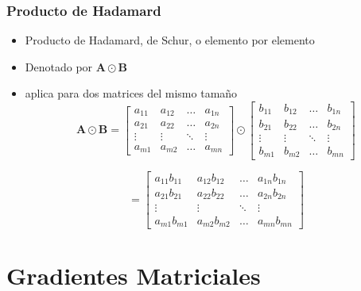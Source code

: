 \documentclass{beamer}
\begin{document}
\begin{frame}
\frametitle{Producto de Hadamard}
\begin{itemize}
\item Producto de Hadamard, de Schur, o elemento por elemento
\item Denotado por $\boldsymbol{A} \odot \boldsymbol{B}$ 
\item aplica para dos matrices del mismo tamaño
\begin{equation*}
\boldsymbol{A} \odot \boldsymbol{B} = \begin{bmatrix} a_{11} &  a_{12} & \dots & a_{1n}\\ a_{21} &  a_{22} & \dots & a_{2n} \\ \vdots &  \vdots & \ddots & \vdots \\ a_{m1} &  a_{m2} & \dots & a_{mn} \end{bmatrix} \odot \begin{bmatrix} b_{11} &  b_{12} & \dots & b_{1n}\\ b_{21} &  b_{22} & \dots & b_{2n} \\ \vdots &  \vdots & \ddots & \vdots \\ b_{m1} &  b_{m2} & \dots & b_{mn} \end{bmatrix}
\end{equation*}

\begin{equation*}
=\begin{bmatrix} a_{11}b_{11} &  a_{12}b_{12} & \dots & a_{1n} b_{1n}\\ a_{21}b_{21} &  a_{22}b_{22} & \dots & a_{2n}b_{2n} \\ \vdots &  \vdots & \ddots & \vdots \\ a_{m1}b_{m1} &  a_{m2}b_{m2}  & \dots & a_{mn}b_{mn} \end{bmatrix} 
\end{equation*}
\end{itemize}
\end{frame}
\section{Gradientes Matriciales}
\end{document}
